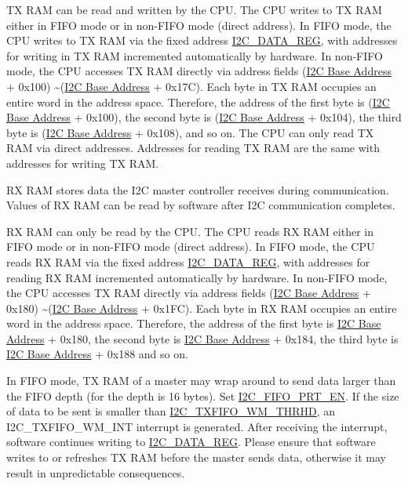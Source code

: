 \documentclass[main\_\_EN.tex]{subfiles}
\begin{document}
TX RAM can be read and written by the CPU. The CPU writes to TX RAM either in FIFO mode or in non-FIFO mode (direct address). In FIFO mode, the CPU writes to TX RAM via the fixed address \hyperref[regdesc:I2CDATAREG]{I2C\_DATA\_REG}, with addresses for writing in TX RAM incremented automatically by hardware. In non-FIFO mode, the CPU accesses TX RAM directly via address fields (\hyperref[tab:sysmem-base-address]{I2C Base Address} + 0x100) \textasciitilde (\hyperref[tab:sysmem-base-address]{I2C Base Address} + 0x17C). Each byte in TX RAM occupies an entire word in the address space. Therefore, the address of the first byte is (\hyperref[tab:sysmem-base-address]{I2C Base Address} + 0x100), the second byte is (\hyperref[tab:sysmem-base-address]{I2C Base Address} + 0x104), the third byte is (\hyperref[tab:sysmem-base-address]{I2C Base Address} + 0x108), and so on. The CPU can only read TX RAM via direct addresses.
Addresses for reading TX RAM are the same with addresses for writing TX RAM.

RX RAM stores data the I2C master controller receives during communication. Values of RX RAM can be read by software after I2C communication completes.

RX RAM can only be read by the CPU. The CPU reads RX RAM either in FIFO mode or in non-FIFO mode (direct address). In FIFO mode, the CPU reads RX RAM via the fixed address \hyperref[regdesc:I2CDATAREG]{I2C\_DATA\_REG}, with addresses for reading RX RAM incremented automatically by hardware. In non-FIFO mode, the CPU accesses TX RAM directly via address fields (\hyperref[tab:sysmem-base-address]{I2C Base Address} + 0x180) \textasciitilde (\hyperref[tab:sysmem-base-address]{I2C Base Address} + 0x1FC). Each byte in RX RAM occupies an entire word in the address space. Therefore, the address of the first byte is \hyperref[tab:sysmem-base-address]{I2C Base Address} + 0x180, the second byte is \hyperref[tab:sysmem-base-address]{I2C Base Address} + 0x184, the third byte is \hyperref[tab:sysmem-base-address]{I2C Base Address} + 0x188 and so on.

In FIFO mode, TX RAM of a master may wrap around to send data larger than the FIFO depth (for \chipname{} the depth is 16 bytes). Set \hyperref[fielddesc:I2CFIFOPRTEN]{I2C\_FIFO\_PRT\_EN}. If the size of data to be sent is smaller than \hyperref[fielddesc:I2CTXFIFOWMTHRHD]{I2C\_TXFIFO\_WM\_THRHD}, an I2C\_TXFIFO\_WM\_INT interrupt is generated. After receiving the interrupt, software continues writing to \hyperref[regdesc:I2CDATAREG]{I2C\_DATA\_REG}. Please ensure that software writes to or refreshes TX RAM before the master sends data, otherwise it may result in unpredictable consequences.
\end{document}
